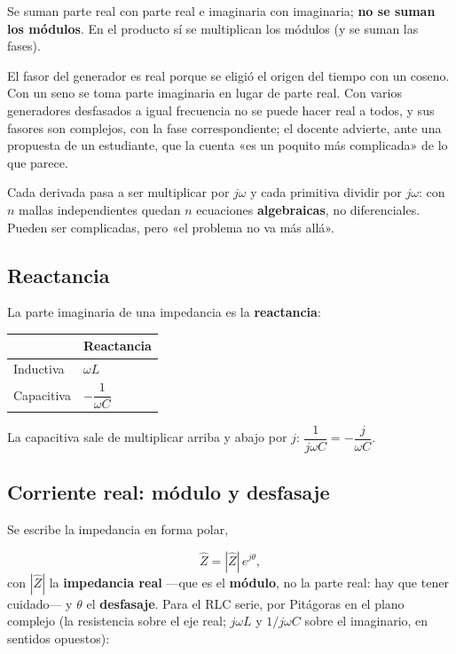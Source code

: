 \documentclass[12pt,a4paper]{article}
\begin{document}
\begin{warnbox}
Se suman parte real con parte real e imaginaria
con imaginaria; \textbf{no se suman los módulos}. En el producto sí se multiplican
los módulos (y se suman las fases).
\end{warnbox}

\begin{notebox}[Fases]
El fasor del generador es real porque se eligió el origen del
tiempo con un coseno. Con un seno se toma parte imaginaria en lugar de parte
real. Con varios generadores desfasados a igual frecuencia no se puede hacer
real a todos, y sus fasores son complejos, con la fase correspondiente; el
docente advierte, ante una propuesta de un estudiante, que la cuenta «es un
poquito más complicada» de lo que parece.
\end{notebox}

Cada derivada pasa a ser multiplicar por $j\omega$ y cada primitiva dividir por
$j\omega$: con $n$ mallas independientes quedan $n$ ecuaciones \textbf{algebraicas},
no diferenciales. Pueden ser complicadas, pero «el problema no va más allá».

\subsection{Reactancia}

La parte imaginaria de una impedancia es la \textbf{reactancia}:

\begin{center}
\renewcommand{\arraystretch}{1.35}
\small
\begin{tabularx}{\textwidth}{l>{\raggedright\arraybackslash}X}
\toprule
 & \textbf{Reactancia} \\
\midrule
Inductiva & $\omega L$ \\
Capacitiva & $-\dfrac{1}{\omega C}$ \\
\bottomrule
\end{tabularx}
\end{center}

La capacitiva sale de multiplicar arriba y abajo por $j$:
$\dfrac{1}{j\omega C} = -\dfrac{j}{\omega C}$.

\subsection{Corriente real: módulo y desfasaje}

Se escribe la impedancia en forma polar,

\[
\hat Z = |\hat Z|\,e^{j\theta},
\]
con $|\hat Z|$ la \textbf{impedancia real} ---que es el \textbf{módulo}, no la parte real:
hay que tener cuidado--- y $\theta$ el \textbf{desfasaje}. Para el RLC serie, por
Pitágoras en el plano complejo (la resistencia sobre el eje real; $j\omega L$ y
$1/j\omega C$ sobre el imaginario, en sentidos opuestos):
\end{document}
